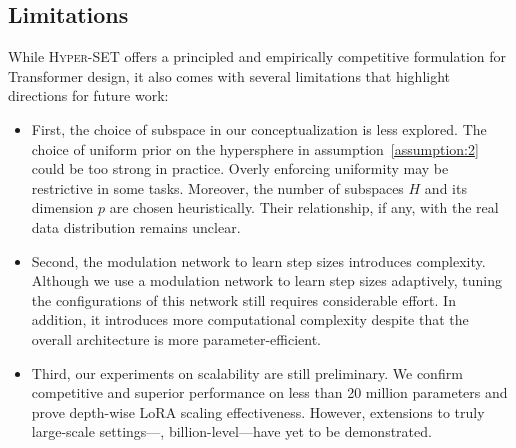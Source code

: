 \subsection{Limitations}
While \textsc{Hyper-SET} offers a principled and empirically competitive formulation for Transformer design, it also comes with several limitations that highlight directions for future work:

\begin{itemize}[leftmargin=*]
    \item First, the choice of subspace in our conceptualization is less explored. The choice of uniform prior on the hypersphere in assumption~\ref{assumption:2} could be too strong in practice. Overly enforcing uniformity may be restrictive in some tasks. Moreover, the number of subspaces $H$ and its dimension $p$ are chosen heuristically. Their relationship, if any, with the real data distribution remains unclear.
    \item Second, the modulation network to learn step sizes introduces complexity. Although we use a modulation network to learn step sizes adaptively, tuning the configurations of this network still requires considerable effort. In addition, it introduces more computational complexity despite that the overall architecture is more parameter-efficient.

    \item Third, our experiments on scalability are still preliminary. We confirm competitive and superior performance on less than 20 million parameters and prove depth-wise LoRA scaling effectiveness. However, extensions to truly large-scale settings—\eg, billion-level—have yet to be demonstrated. 
\end{itemize} 

